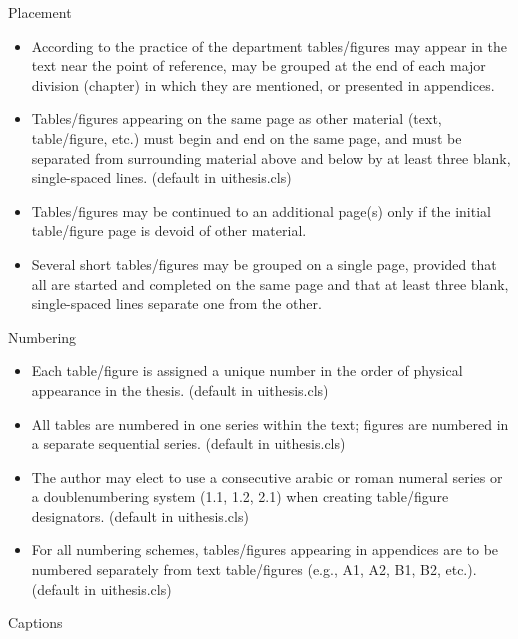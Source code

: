 \noindent Placement
\begin{itemize}
\item According to the practice of the department tables/figures may appear
in the text near the point of reference, may be grouped at the end
of each major division (chapter) in which they are mentioned, or presented
in appendices.
\item Tables/figures appearing on the same page as other material (text,
table/figure, etc.) must begin and end on the same page, and must
be separated from surrounding material above and below by at least
three blank, single-spaced lines. (default in uithesis.cls)
\item Tables/figures may be continued to an additional page(s) only if the
initial table/figure page is devoid of other material.
\item Several short tables/figures may be grouped on a single page, provided
that all are started and completed on the same page and that at least
three blank, single-spaced lines separate one from the other.
\end{itemize}
Numbering
\begin{itemize}
\item Each table/figure is assigned a unique number in the order of physical
appearance in the thesis. (default in uithesis.cls)
\item All tables are numbered in one series within the text; figures are
numbered in a separate sequential series. (default in uithesis.cls)
\item The author may elect to use a consecutive arabic or roman numeral
series or a doublenumbering system (1.1, 1.2, 2.1) when creating table/figure
designators. (default in uithesis.cls)
\item For all numbering schemes, tables/figures appearing in appendices
are to be numbered separately from text table/figures (e.g., A1, A2,
B1, B2, etc.). (default in uithesis.cls)
\end{itemize}
Captions
